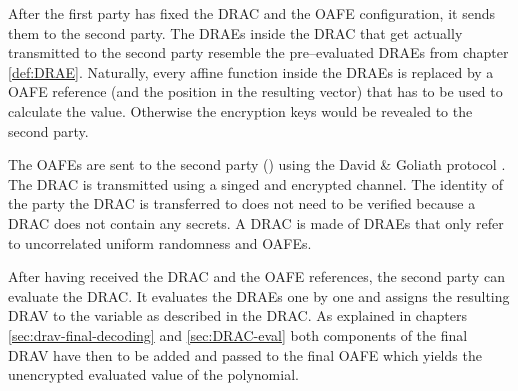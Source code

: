 After the first party has fixed the DRAC and the OAFE configuration, it sends
them to the second party. The DRAEs inside the DRAC that get actually
transmitted to the second party resemble the pre--evaluated DRAEs from chapter
\ref{def:DRAE}. Naturally, every affine function inside the DRAEs is replaced by
a OAFE reference (and the position in the resulting vector) that has to be used
to calculate the value. Otherwise the encryption keys would be revealed to the
second party.

The OAFEs are sent to the second party (\JWpTwo{}) using the David \& Goliath
protocol \cite{davidgoliath}. The DRAC is transmitted using a singed and
encrypted channel. The identity of the party the DRAC is transferred to does not
need to be verified because a DRAC does not contain any secrets. A DRAC is made
of DRAEs that only refer to uncorrelated uniform randomness and OAFEs.

After having received the DRAC and the OAFE references, the second party can
evaluate the DRAC. It evaluates the DRAEs one by one and assigns the resulting
DRAV to the variable as described in the DRAC. As explained in chapters
\ref{sec:drav-final-decoding} and \ref{sec:DRAC-eval} both components of the
final DRAV have then to be added and passed to the final OAFE which yields the
unencrypted evaluated value of the polynomial.


\label{sec:checking-poly-degree}



%
%
\label{sec:example}



